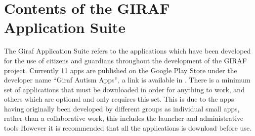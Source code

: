 \section{Contents of the GIRAF Application Suite}

The Giraf Application Suite refers to the applications which have been developed for the use of citizens and guardians throughout the development of the GIRAF project. 
Currently 11 apps are published on the Google Play Store under the developer name ``Giraf Autism Apps'', a link is available in \cite{GIRAFGOOGLEPLAY}.
There is a minimum set of applications that must be downloaded in order for anything to work, and others which are optional and only requires this set. 
This is due to the apps having originally been developed by different groups as individual small apps, rather than a collaborative work, this includes the launcher and administrative tools
However it is recommended that all the applications is download before use. 
